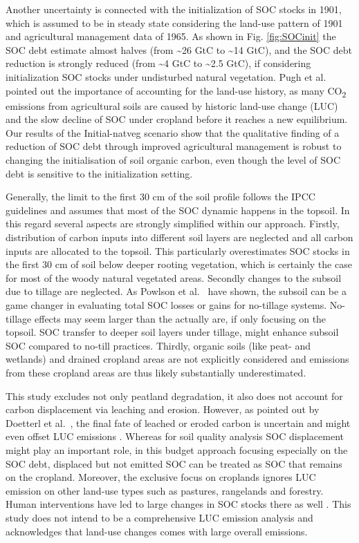 \documentclass[gc, manuscript]{copernicus}
\begin{document}
Another uncertainty is connected with the initialization of SOC stocks in 1901, which is assumed to be in steady state considering the land-use pattern of 1901 and agricultural management data of 1965. As shown in Fig. \ref{fig:SOCinit} the SOC debt estimate almost halves (from \textasciitilde26 GtC to \textasciitilde14 GtC), and the SOC debt reduction is strongly reduced (from \textasciitilde4 GtC to \textasciitilde2.5 GtC), if considering initialization SOC stocks under undisturbed natural vegetation. Pugh et al.~\citeyearpar{pugh_simulated_2015} pointed out the importance of accounting for the land-use history, as many CO\textsubscript{2} emissions from agricultural soils are caused by historic land-use change (LUC) and the slow decline of SOC under cropland before it reaches a new equilibrium. Our results of the Initial-natveg scenario show that the qualitative finding of a reduction of SOC debt through improved agricultural management is robust to changing the initialisation of soil organic carbon, even though the level of SOC debt is sensitive to the initialization setting.

Generally, the limit to the first 30 cm of the soil profile follows the IPCC guidelines \citep{eggleston_ipcc_2006, calvo_buendia_ipcc_2019} and assumes that most of the SOC dynamic happens in the topsoil. In this regard several aspects are strongly simplified within our approach. Firstly, distribution of carbon inputs into different soil layers are neglected and all carbon inputs are allocated to the topsoil. This particularly overestimates SOC stocks in the first 30 cm of soil below deeper rooting vegetation, which is certainly the case for most of the woody natural vegetated areas. Secondly changes to the subsoil due to tillage are neglected. As Powlson et al.~\citeyearpar{powlson_limited_2014} have shown, the subsoil can be a game changer in evaluating total SOC losses or gains for no-tillage systems. No-tillage effects may seem larger than the actually are, if only focusing on the topsoil. SOC transfer to deeper soil layers under tillage, might enhance subsoil SOC compared to no-till practices. Thirdly, organic soils (like peat- and wetlands) and drained cropland areas are not explicitly considered and emissions from these cropland areas are thus likely substantially underestimated.

This study excludes not only peatland degradation, it also does not account for carbon displacement via leaching and erosion. However, as pointed out by Doetterl et al.~\citeyearpar{doetterl_erosion_2016}, the final fate of leached or eroded carbon is uncertain and might even offset LUC emissions \citep{wang_human-induced_2017}. Whereas for soil quality analysis SOC displacement might play an important role, in this budget approach focusing especially on the SOC debt, displaced but not emitted SOC can be treated as SOC that remains on the cropland.
Moreover, the exclusive focus on croplands ignores LUC emission on other land-use types such as pastures, rangelands and forestry. Human interventions have led to large changes in SOC stocks there as well \citep{sanderman_soil_2017, friedlingstein_global_2019}. This study does not intend to be a comprehensive LUC emission analysis and acknowledges that land-use changes comes with large overall emissions.
\end{document}
